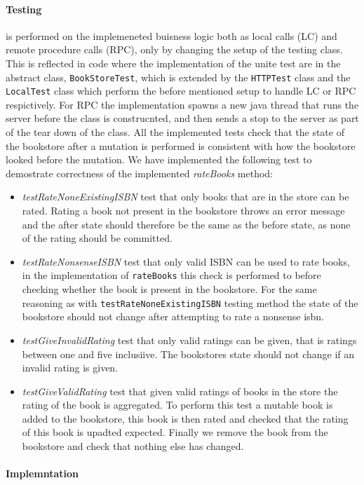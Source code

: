 \documentclass[a4paper]{article}
\begin{document}
\paragraph{Testing} is performed on the implemeneted buisness logic both as local calls (LC) and remote procedure calls (RPC), only by changing the setup of the testing class. This is reflected in code where the implementation of the unite test are in the abstract class, \texttt{BookStoreTest}, which is extended by the \texttt{HTTPTest} class and the \texttt{LocalTest} class which perform the before mentioned setup to handle LC or RPC respictively. For RPC the implementation spawns a new java thread that runs the server before the class is construcnted, and then sends a stop to the server as part of the tear down of the class. All the implemented tests check that the state of the bookstore after a mutation is performed is consistent with how the bookstore looked before the mutation.
We have implemented the following test to demostrate correctness of the implemented \textit{rateBooks} method:
\begin{itemize}
\item \textit{testRateNoneExistingISBN} test that only books that are in the store can be rated. Rating a book not present in the bookstore throws an error message and the after state should therefore be the same as the before state, as none of the rating should be committed.
\item \textit{testRateNonsenseISBN} test that only valid ISBN can be used to rate books, in the implementation of \texttt{rateBooks} this check is performed to before checking whether the book is present in the bookstore. For the same reasoning as with \texttt{testRateNoneExistingISBN} testing method the state of the bookstore should not change after attempting to rate a nonsense isbn.
\item \textit{testGiveInvalidRating} test that only valid ratings can be given, that is ratings between one and five inclusiive. The bookstores state should not change if an invalid rating is given.
\item \textit{testGiveValidRating} test that given valid ratings of books in the store the rating of the book is aggregated. To perform this test a mutable book is added to the bookstore, this book is then rated and checked that the rating of this book is upadted expected. Finally we remove the book from the bookstore and check that nothing else has changed.
\end{itemize}
\paragraph{Implemntation}
\end{document}
